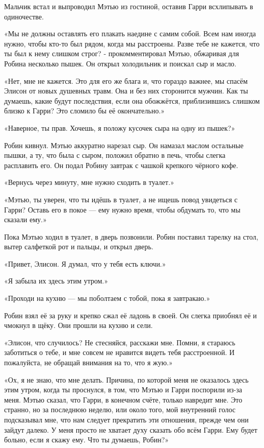 \documentclass[a4paper,12pt]{book}
\begin{document}
Мальчик встал и выпроводил Мэтью из гостиной, оставив Гарри всхлипывать в одиночестве.
\par
«Мы не должны оставлять его плакать наедине с самим собой. Всем нам иногда нужно, чтобы кто-то был рядом, когда мы расстроены. Разве тебе не кажется, что ты был к нему слишком строг? - прокомментировал Мэтью, обжаривая для Робина несколько пышек. Он открыл холодильник и поискал сыр и масло.
\par
«Нет, мне не кажется. Это для его же блага и, что гораздо важнее, мы спасём Элисон от новых душевных травм. Она и без них сторонится мужчин. Как ты думаешь, какие будут последствия, если она обожжётся, приблизившись слишком близко к Гарри? Это сломило бы её окончательно.»
\par
«Наверное, ты прав. Хочешь, я положу кусочек сыра на одну из пышек?»
\par
Робин кивнул. Мэтью аккуратно нарезал сыр. Он намазал маслом остальные пышки, а ту, что была с сыром, положил обратно в печь, чтобы слегка расплавить его. Он подал Робину завтрак с чашкой крепкого чёрного кофе.
\par
«Вернусь через минуту, мне нужно сходить в туалет.»
\par
«Мэтью, ты уверен, что ты идёшь в туалет, а не ищешь повод увидеться с Гарри? Оставь его в покое — ему нужно время, чтобы обдумать то, что мы сказали ему.»
\par
Пока Мэтью ходил в туалет, в дверь позвонили. Робин поставил тарелку на стол, вытер салфеткой рот и пальцы, и открыл дверь.
\par
«Привет, Элисон. Я думал, что у тебя есть ключи.»
\par
«Я забыла их здесь этим утром.»
\par
«Проходи на кухню — мы поболтаем с тобой, пока я завтракаю.»
\par
Робин взял её за руку и крепко сжал её ладонь в своей. Он слегка приобнял её и чмокнул в щёку. Они прошли на кухню и сели.
\par
«Элисон, что случилось? Не стесняйся, расскажи мне. Помни, я стараюсь заботиться о тебе, и мне совсем не нравится видеть тебя расстроенной. И пожалуйста, не обращай внимания на то, что я жую.»
\par
«Ох, я не знаю, что мне делать. Причина, по которой меня не оказалось здесь этим утром, когда ты проснулся, в том, что Мэтью и Гарри поспорили из-за меня. Мэтью сказал, что Гарри, в конечном счёте, только навредит мне. Это странно, но за последнюю неделю, или около того, мой внутренний голос подсказывал мне, что нам следует прекратить эти отношения, прежде чем они зайдут далеко. У меня просто не хватает духу сказать обо всём Гарри. Ему будет больно, если я скажу ему. Что ты думаешь, Робин?»
\end{document}
